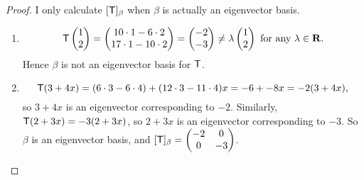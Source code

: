 \begin{proof}
I only calculate \([\textsf{T}]_{\beta}\) when \(\beta\) is actually an eigenvector basis.

\begin{enumerate}
\item
\[
    \textsf{T} \begin{pmatrix} 1 \\ 2 \end{pmatrix} = \begin{pmatrix}
        10 \cdot 1 - 6 \cdot 2 \\
        17 \cdot 1 - 10 \cdot 2
    \end{pmatrix}
    = \begin{pmatrix}
        -2 \\ -3
    \end{pmatrix} \ne \lambda \begin{pmatrix} 1 \\ 2 \end{pmatrix} \text{ for any } \lambda \in \mathbf{R}.
\]
Hence \(\beta\) is not an eigenvector basis for \(\textsf{T}\).

\item
\[
    \textsf{T}(3 + 4x) = (6 \cdot 3 - 6 \cdot 4) + (12 \cdot 3 - 11 \cdot 4)x = -6 + -8x = -2(3 + 4x),
\]
so \(3 + 4x\) is an eigenvector corresponding to \(-2\).
Similarly, \(\textsf{T}(2 + 3x) = -3(2 + 3x)\), so \(2 + 3x\) is an eigenvector corresponding to \(-3\).
So \(\beta\) is an eigenvector basis, and \([\textsf{T}]_{\beta} = \begin{pmatrix} -2 & 0 \\ 0 & -3 \end{pmatrix}\).


\end{enumerate}
\end{proof}
